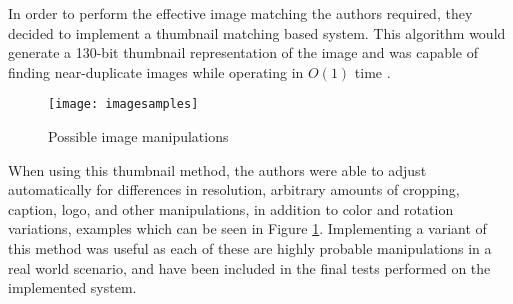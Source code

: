 In order to perform the effective image matching the authors required, they decided to implement a thumbnail matching based system. This algorithm would generate a 130-bit thumbnail representation of the image and was capable of finding near-duplicate images while operating in $O(1)$ time \cite{Srinivasan:2008}.

\begin{figure}[htbp]
\centering
\texttt{[image: imagesamples]}
\caption{Possible image manipulations}
\label{imgsample}
\end{figure}

When using this thumbnail method, the authors were able to adjust automatically for differences in resolution, arbitrary amounts of cropping, caption, logo, and other manipulations, in addition to color and rotation variations, examples which can be seen in Figure \ref{imgsample}. Implementing a variant of this method was useful as each of these are highly probable manipulations in a real world scenario, and have been included in the final tests performed on the implemented system.

